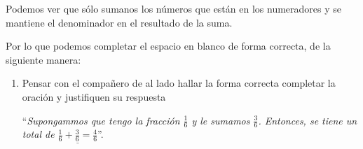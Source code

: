 \documentclass[12pt]{examdesign}
\theoremstyle{plain}
\theoremstyle{definition}
\theoremstyle{remark}
\begin{document}
\begin{endmatter}
\begin{itemize}
	 	\begin{figure}[H]
	 		\centering
	 	\end{figure}	 	
	 	Podemos ver que sólo sumanos los números que están en los numeradores y se mantiene el denominador en el resultado de la suma.
	 \end{itemize}
	 
	 Por lo que podemos completar el espacio en blanco de forma correcta, de la siguiente manera:
	 
	 \begin{tcolorbox}[opteqC]
	 	\def\blank#1{$\underline{\mbox{#1}}$}
	 	\begin{enumerate}%
	 		\item Pensar con el compañero de al lado hallar la forma correcta completar la oración y justifiquen su respuesta
	 		\begin{center}
	 			``\textit{Supongammos que tengo la fracción $\frac{1}{6}$ y le sumamos $\frac{3}{6}$. Entonces, se tiene un total de \blank{$\frac{1}{6} + \frac{3}{6}= \frac{4}{6}$}}''.
	 		\end{center}
	 	\end{enumerate}%
	 \end{tcolorbox}	
	\end{endmatter}
\end{document}
